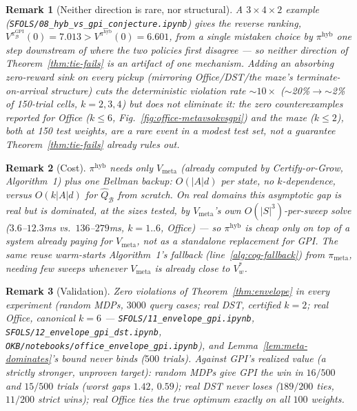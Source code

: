 \documentclass[11pt]{article}
\newtheorem{remark}{Remark}
\begin{document}
\begin{remark}[Neither direction is rare, nor structural]
A $3\times4\times2$ example (\texttt{SFOLS/08\_hyb\_vs\_gpi\_conjecture.ipynb}) gives the reverse ranking,
$V^{\pi^{\mathrm{GPI}}_{\mathcal B}}(0)=7.013>V^{\pi^{\mathrm{hyb}}}(0)=6.601$, from a single mistaken choice by
$\pi^{\mathrm{hyb}}$ one step downstream of where the two policies first disagree — so neither direction of
Theorem~\ref{thm:tie-fails} is an artifact of one mechanism. Adding an absorbing zero-reward sink on every pickup
(mirroring Office/DST/the maze's terminate-on-arrival structure) cuts the deterministic violation rate
$\sim\!10\times$ ($\sim$20\%$\to$$\sim$2\% of 150-trial cells, $k=2,3,4$) but does not eliminate it: the zero
counterexamples reported for Office ($k\le6$, Fig.~\ref{fig:office-metavsokvsgpi}) and the maze ($k\le2$), both at 150
test weights, are a rare event in a modest test set, not a guarantee Theorem~\ref{thm:tie-fails} already rules out.
\end{remark}

\begin{remark}[Cost]\label{rem:cost}
$\pi^{\mathrm{hyb}}$ needs only $V_{\mathrm{meta}}$ (already computed by Certify-or-Grow, Algorithm~1) plus one
Bellman backup: $O(|A|d)$ per state, no $k$-dependence, versus $O(k|A|d)$ for $\widehat Q_{\mathcal B}$ from scratch.
On real domains this asymptotic gap is real but is dominated, at the sizes tested, by $V_{\mathrm{meta}}$'s own
$O(|S|^3)$-per-sweep solve ($3.6$–$12.3$ms vs.\ $136$–$279$ms, $k{=}1..6$, Office) — so $\pi^{\mathrm{hyb}}$ is cheap
only \emph{on top of} a system already paying for $V_{\mathrm{meta}}$, not as a standalone replacement for GPI. The
same reuse warm-starts Algorithm~1's fallback (line~\ref*{alg:cog-fallback}) from $\pi_{\mathrm{meta}}$, needing few
sweeps whenever $V_{\mathrm{meta}}$ is already close to $V^*_w$.
\end{remark}

\begin{remark}[Validation]\label{rem:validation}
Zero violations of Theorem~\ref{thm:envelope} in every experiment (random MDPs, $3000$ query cases; real DST,
certified $k{=}2$; real Office, canonical $k{=}6$ — \texttt{SFOLS/11\_envelope\_gpi.ipynb},
\texttt{SFOLS/12\_envelope\_gpi\_dst.ipynb}, \texttt{OKB/notebooks/office\_envelope\_gpi.ipynb}), and
Lemma~\ref{lem:meta-dominates}'s bound never binds ($500$ trials). Against GPI's \emph{realized} value (a strictly
stronger, unproven target): random MDPs give GPI the win in $16/500$ and $15/500$ trials (worst gaps $1.42$, $0.59$);
real DST never loses ($189/200$ ties, $11/200$ strict wins); real Office ties the true optimum exactly on all
$100$ weights.
\end{remark}
\end{document}

